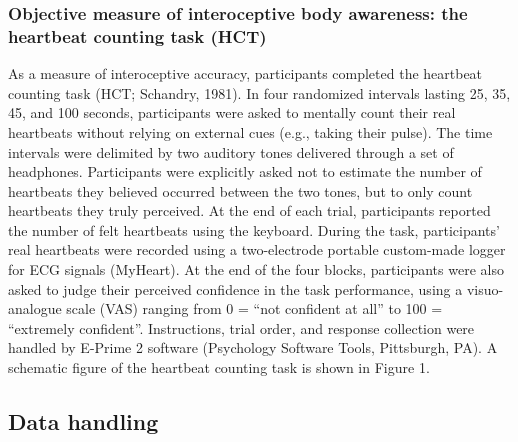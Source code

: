 \documentclass[man]{apa7}
\begin{document}
\subsubsection{Objective measure of interoceptive body awareness: the heartbeat counting task (HCT)} 
As a measure of interoceptive accuracy, participants completed the heartbeat counting task (HCT; Schandry, 1981). In four randomized intervals lasting 25, 35, 45, and 100 seconds, participants were asked to mentally count their real heartbeats without relying on external cues (e.g., taking their pulse). The time intervals were delimited by two auditory tones delivered through a set of headphones. Participants were explicitly asked not to estimate the number of heartbeats they believed occurred between the two tones, but to only count heartbeats they truly perceived. At the end of each trial, participants reported the number of felt heartbeats using the keyboard. During the task, participants’ real heartbeats were recorded using a two-electrode portable custom-made logger for ECG signals (MyHeart). At the end of the four blocks, participants were also asked to judge their perceived confidence in the task performance, using a visuo-analogue scale (VAS) ranging from 0 = “not confident at all” to 100 = “extremely confident”. Instructions, trial order, and response collection were handled by E-Prime 2 software (Psychology Software Tools, Pittsburgh, PA). A schematic figure of the heartbeat counting task is shown in Figure 1.
\subsection{Data handling}
\end{document}
